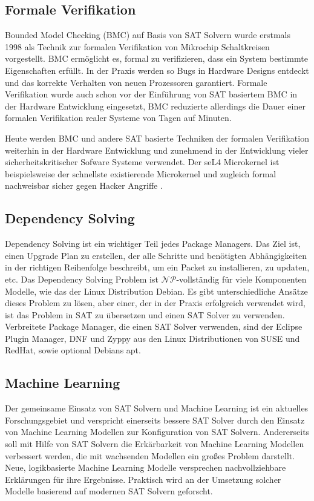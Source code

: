 \documentclass[conference,compsoc,final,a4paper]{IEEEtran}
\begin{document}
\subsection{Formale Verifikation}
Bounded Model Checking (BMC) auf Basis von SAT Solvern wurde erstmals 1998 als Technik zur formalen Verifikation von Mikrochip Schaltkreisen vorgestellt. BMC ermöglicht es, formal zu verifizieren, dass ein System bestimmte Eigenschaften erfüllt. In der Praxis werden so Bugs in Hardware Designs entdeckt und das korrekte Verhalten von neuen Prozessoren garantiert. Formale Verifikation wurde auch schon vor der Einführung von SAT basiertem BMC in der Hardware Entwicklung eingesetzt, BMC reduzierte allerdings die Dauer einer formalen Verifikation realer Systeme von Tagen auf Minuten. \cite{sat_solving_in_practice_2008}

Heute werden BMC und andere SAT basierte Techniken der formalen Verifikation weiterhin in der Hardware Entwicklung und zunehmend in der Entwicklung vieler sicherheitskritischer Sofware Systeme verwendet. Der seL4 Microkernel ist beispielsweise der schnellste existierende Microkernel und zugleich formal nachweisbar sicher gegen Hacker Angriffe \cite{seL4}.

\subsection{Dependency Solving}
Dependency Solving ist ein wichtiger Teil jedes Package Managers. Das Ziel ist, einen Upgrade Plan zu erstellen, der alle Schritte und benötigten Abhängigkeiten in der richtigen Reihenfolge beschreibt, um ein Packet zu installieren, zu updaten, etc. Das Dependency Solving Problem ist $\mathcal{NP}$-vollständig für viele Komponenten Modelle, wie das der Linux Distribution Debian. Es gibt unterschiedliche Ansätze dieses Problem zu lösen, aber einer, der in der Praxis erfolgreich verwendet wird, ist das Problem in SAT zu übersetzen und einen SAT Solver zu verwenden. Verbreitete Package Manager, die einen SAT Solver verwenden, sind der Eclipse Plugin Manager, DNF und Zyppy aus den Linux Distributionen von SUSE und RedHat, sowie optional Debians apt. \cite{dependency_solving}

\subsection{Machine Learning}
Der gemeinsame Einsatz von SAT Solvern und Machine Learning ist ein aktuelles Forschungsgebiet und verspricht einerseits bessere SAT Solver durch den Einsatz von Machine Learning Modellen zur Konfiguration von SAT Solvern. Andererseits soll mit Hilfe von SAT Solvern die Erkärbarkeit von Machine Learning Modellen verbessert werden, die mit wachsenden Modellen ein großes Problem darstellt. Neue, logikbasierte Machine Learning Modelle versprechen nachvollziehbare Erklärungen für ihre Ergebnisse. Praktisch wird an der Umsetzung solcher Modelle basierend auf modernen SAT Solvern geforscht. \cite{computing_with_sat_oracles}
\end{document}
